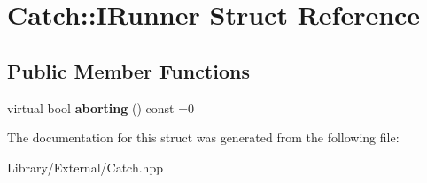 \hypertarget{struct_catch_1_1_i_runner}{}\section{Catch\+:\+:I\+Runner Struct Reference}
\label{struct_catch_1_1_i_runner}
\subsection*{Public Member Functions}
\begin{DoxyCompactItemize}
\item 
\hypertarget{struct_catch_1_1_i_runner_a03713202dd2e041e30b8030088ab0116}{}virtual bool {\bfseries aborting} () const =0\label{struct_catch_1_1_i_runner_a03713202dd2e041e30b8030088ab0116}

\end{DoxyCompactItemize}


The documentation for this struct was generated from the following file\+:\begin{DoxyCompactItemize}
\item 
Library/\+External/Catch.\+hpp\end{DoxyCompactItemize}
